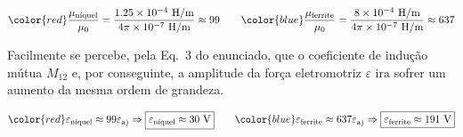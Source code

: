 \documentclass[11pt,a4paper,final]{article}
\begin{document}
\begin{equation*}
\color{red}\frac{\mu_{\text{n\'{i}quel}}}{\mu_0}=\frac{1.25\times10^{-4}~\text{H/m}}{4\pi\times10^{-7}~\text{H/m}}\approx99\qquad\color{blue}\frac{\mu_{\text{ferrite}}}{\mu_0}=\frac{8\times10^{-4}~\text{H/m}}{4\pi\times10^{-7}~\text{H/m}}\approx637
\end{equation*}

Facilmente se percebe, pela Eq.~3 do enunciado, que o coeficiente de indu\c{c}\~{a}o m\'{u}tua $M_{12}$ e, por conseguinte, a amplitude da for\c{c}a eletromotriz $\varepsilon$ ira sofrer um aumento da mesma ordem de grandeza.

\begin{equation*}
\color{red}\varepsilon_{\text{n\'{i}quel}}\approx99\varepsilon_\text{a)}\Rightarrow\boxed{\varepsilon_{\text{n\'{i}quel}}\approx30~\text{V}}
\qquad
\color{blue}\varepsilon_{\text{ferrite}}\approx637\varepsilon_\text{a)}\Rightarrow\boxed{\varepsilon_{\text{ferrite}}\approx191~\text{V}}
\end{equation*}
\end{document}
